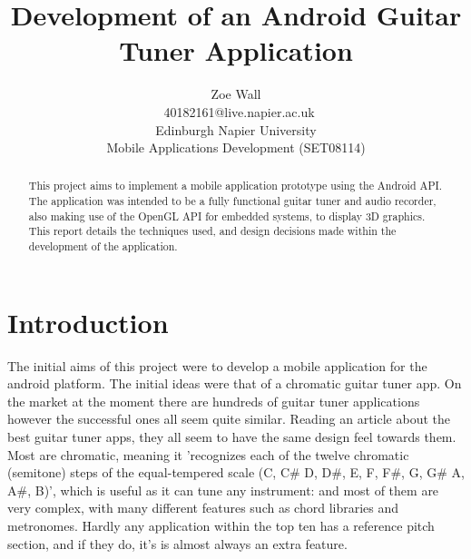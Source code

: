 \documentclass[conference]{acmsiggraph}
\title{Development of an Android Guitar Tuner Application}
\author{Zoe Wall \\\ 40182161@live.napier.ac.uk \\
Edinburgh Napier University \\
Mobile Applications Development (SET08114)}
\newcommand{\figuremacroW}[4]{
	\begin{figure}[!ht] %
		\centering
		\texttt{[image: \#1]}
		\caption[#2]{\textbf{#2} - #3}
		\label{fig:#1}
	\end{figure}
}
\begin{document}

\maketitle

\begin{abstract} %
This project aims to implement a mobile application prototype using the Android API. The application was intended to be a fully functional guitar tuner and audio recorder, also making use of the OpenGL API for embedded systems, to display 3D graphics. This report details the techniques used, and design decisions made within the development of the application.
\end{abstract}

\keywordlist




\section{Introduction}

The initial aims of this project were to develop a mobile application for the android platform. The initial ideas were that of a chromatic guitar tuner app. On the market at the moment there are hundreds of guitar tuner applications however the successful ones all seem quite similar. Reading an article about the best guitar tuner apps, they all seem to have the same design feel towards them. \cite{bestApps} Most are chromatic, meaning it 'recognizes each of the twelve chromatic (semitone) steps of the equal-tempered scale (C, C\# D, D\#, E, F, F\#, G, G\# A, A\#, B)', \cite{Roland} which is useful as it can tune any instrument: and most of them are very complex, with many different features such as chord libraries and metronomes. Hardly any application within the top ten has a reference pitch section, and if they do, it's is almost always an extra feature. %
\end{document}
